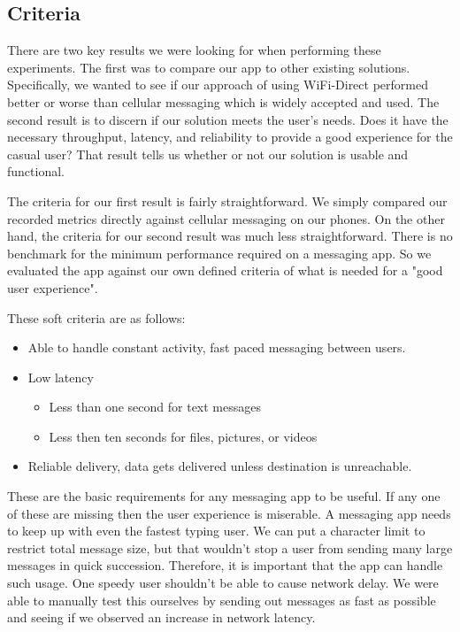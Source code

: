 \documentclass[10pt]{article}
\begin{document}
\subsection{Criteria}

There are two key results we were looking for when performing these experiments. The first was to compare our app to other existing solutions. Specifically, we wanted to see if our approach of using WiFi-Direct performed better or worse than cellular messaging which is widely accepted and used. The second result is to discern if our solution meets the user's needs. Does it have the necessary throughput, latency, and reliability to provide a good experience for the casual user? That result tells us whether or not our solution is usable and functional.

The criteria for our first result is fairly straightforward. We simply compared our recorded metrics directly against cellular messaging on our phones. On the other hand, the criteria for our second result was much less straightforward. There is no benchmark for the minimum performance required on a messaging app. So we evaluated the app against our own defined criteria of what is needed for a "good user experience".

These soft criteria are as follows:

\begin{itemize}
    \item Able to handle constant activity, fast paced messaging between users.
    \item Low latency
          \begin{itemize}
              \item Less than one second for text messages
              \item Less then ten seconds for files, pictures, or videos
          \end{itemize}
    \item Reliable delivery, data gets delivered unless destination is unreachable.
\end{itemize}

These are the basic requirements for any messaging app to be useful. If any one of these are missing then the user experience is miserable.
A messaging app needs to keep up with even the fastest typing user. We can put a character limit to restrict total message size, but that wouldn't stop a user from sending many large messages in quick succession. Therefore, it is important that the app can handle such usage. One speedy user shouldn't be able to cause network delay. We were able to manually test this ourselves by sending out messages as fast as possible and seeing if we observed an increase in network latency.
\end{document}
